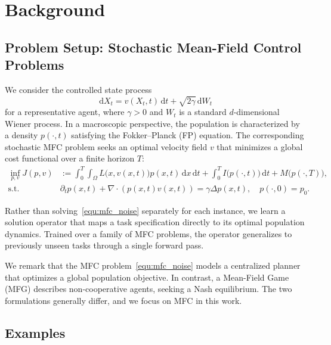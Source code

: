 \documentclass[preprint]{elsarticle}
\newcommand{\dd}{\,\mathrm{d}}          %
\newcommand{\qb}[1]{\bigl(#1\bigr)}          %
\newcommand{\g}{\gamma}
\newcommand{\Om}{\Omega}
\begin{document}
\section{Background}\label{sec:background}
\subsection{Problem Setup: Stochastic Mean-Field Control Problems}\label{sec:mfc}

We consider the controlled state process
\begin{equation}
\dd X_t = v(X_t,t)\dd t + \sqrt{2\g} \dd W_t  \label{equ:sde}
\end{equation}
for a representative agent, where $\g>0$ and $W_t$ is a standard $d$-dimensional Wiener process. In a macroscopic perspective, the population is characterized by a density $p(\cdot,t)$ satisfying the Fokker--Planck (FP) equation. The corresponding stochastic MFC problem seeks an optimal velocity field $v$ that minimizes a global cost functional over a finite horizon $T$:
\begin{align}
    \inf_{p,v}  J(p,v)
    &:= \int_0^T\!\int_\Om L\qb{x,v(x,t)}p(x,t) \dd x\dd t
    + \int_0^T I\qb{p(\cdot,t)}\dd t
    + M\qb{p(\cdot,T)},  \label{equ:mfc_noise} \\
    \text{s.t.}\quad&
    \partial_t p(x,t) + \nabla\!\cdot\!(p(x,t)v(x,t)) = \g\Delta p(x,t),\quad
    p(\cdot,0) = p_0. \label{equ:fp}
\end{align}

Rather than solving~\eqref{equ:mfc_noise} separately for each instance, we learn a solution operator that maps a task specification directly to its optimal population dynamics. Trained over a family of MFC problems, the operator generalizes to previously unseen tasks through a single forward pass.

We remark that the MFC problem~\eqref{equ:mfc_noise} models a centralized planner that optimizes a global population objective. In contrast, a Mean-Field Game (MFG) describes non-cooperative agents, seeking a Nash equilibrium. The two formulations generally differ, and we focus on MFC in this work.

\subsection{Examples}\label{sec:examples}
\end{document}
